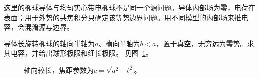 这里的椭球导体与均匀实心带电椭球不是同一个源问题。导体内部场为零，电荷在表面；用于外势的共焦积分只确定该等势边界问题。用不同模型的内部场来推电容，会混淆源与边界。


\begin{example}[长旋转椭球的焦线构造]\label{ex:es3-e9}
导体长旋转椭球的轴向半轴为$a$、横向半轴为$b<a$，置于真空，无穷远为零势。求其电容，并给出球形极限和细长极限。 见图~\ref{fig:es3-e9-q}。
\end{example}

\begin{figure}[H]\centering
{}
\caption{轴向较长，焦距参数为$c=\sqrt{a^2-b^2}$。}\label{fig:es3-e9-q}
\end{figure}
